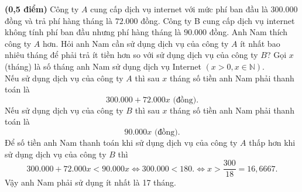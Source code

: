 \begin{ex}{\bf (0,5 điểm)} Công ty $A$ cung cấp dịch vụ internet với mức phí ban đầu là $300.000$ đồng và trả phí hàng tháng là $72.000$ đồng. Công ty B cung cấp dịch vụ internet không tính phí ban đầu nhưng phí hàng tháng là $90.000$ đồng. Anh Nam thích công ty $A$ hơn. Hỏi anh Nam cần sử dụng dịch vụ của công ty $A$ ít nhất bao nhiêu tháng để phải trả ít tiền hơn so với sử dụng dịch vụ của công ty $B$?
\loigiai
	{
	Gọi $x$ (tháng) là số tháng anh Nam sử dụng dịch vụ Internet $\left( x>0, x \in \mathbb{N} \right)$.\\
	Nếu sử dụng dịch vụ của công ty $A$ thì sau $x$ tháng số tiền anh Nam phải thanh toán là
	$$300.000+72.000x \text{ (đồng)}.$$
	Nếu sử dụng dịch vụ của công ty $B$ thì sau $x$ tháng số tiền anh Nam phải thanh toán là $$90.000x\text{ (đồng)}.$$
		Để số tiền anh Nam thanh toán khi sử dụng dịch vụ của công ty $A$ thấp hơn khi sử dụng dịch vụ của công ty $B$ thì $$300.000+72.000x <90.000x \Leftrightarrow 300.000<180.\Leftrightarrow x> \dfrac{300}{18}=16,6667.$$
	Vậy anh Nam phải sử dụng ít nhất là 17 tháng.
}
\end{ex}

